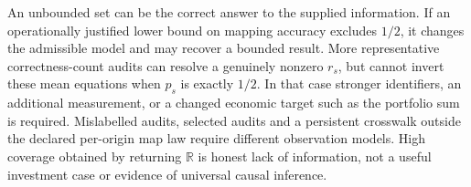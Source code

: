 

An unbounded set can be the correct answer to the supplied information.
If an operationally justified lower bound on mapping accuracy excludes
$1/2$, it changes the admissible model and may recover a bounded result.
More representative correctness-count audits can resolve a genuinely nonzero
$r_s$, but cannot invert these mean equations when $p_s$ is exactly $1/2$.
In that case stronger identifiers, an additional measurement, or a changed
economic target such as the portfolio sum is required. Mislabelled audits,
selected audits and a persistent crosswalk outside the declared per-origin
map law require different observation models. High coverage obtained by
returning $\mathbb R$ is honest lack of information, not a useful investment
case or evidence of universal causal inference.
